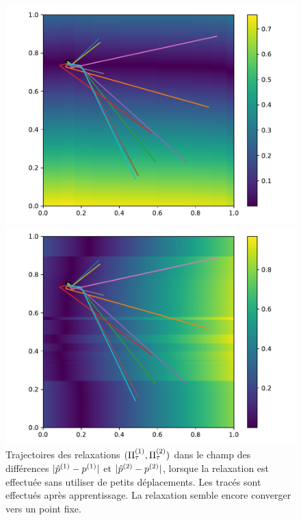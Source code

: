 \documentclass[../main]{subfiles}
\begin{document}
\begin{figure}
\begin{minipage}{0.5\textwidth}
\includegraphics[width=\textwidth]{champ_X_009}
\end{minipage}
\begin{minipage}{0.5\textwidth}
\includegraphics[width=\textwidth]{champ_Y_009}
\end{minipage}
\caption{Trajectoires des relaxations $(\Pi^{({1})}_{\tau},\Pi^{({2})}_\tau)$ dans le champ des différences $\lvert \hat{p}^{({1})} - p^{({1})} \rvert $ et $\lvert \hat{p}^{({2})} - p^{({2})} \rvert$, lorsque la relaxation est effectuée sans utiliser de petits déplacements. Les tracés sont effectués après apprentissage. La relaxation semble encore converger vers un point fixe.}
\label{fig:diff_nopas}
\end{figure}
\end{document}
